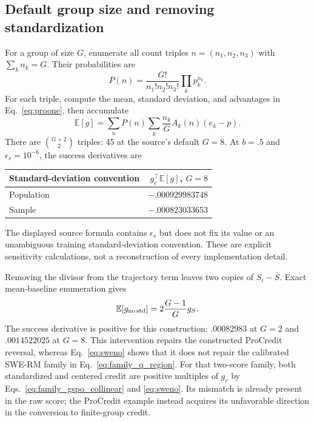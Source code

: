 \documentclass[11pt]{article}
\newcommand{\E}{\mathbb E}
\begin{document}
\subsection{Default group size and removing standardization}
For a group of size $G$, enumerate all count triples $n=(n_1,n_2,n_3)$ with $\sum_kn_k=G$. Their probabilities are
\begin{equation}
P(n)=\frac{G!}{n_1!n_2!n_3!}\prod_kp_k^{n_k}.
\end{equation}
For each triple, compute the mean, standard deviation, and advantages in Eq.~\eqref{eq:proone}, then accumulate
\begin{equation}
\E[g]=\sum_nP(n)\sum_k\frac{n_k}{G}A_k(n)(e_k-p).
\label{eq:counts}
\end{equation}
There are $\binom{G+2}{2}$ triples: 45 at the source's default $G=8$. At $b=.5$ and $\epsilon_s=10^{-6}$, the success derivatives are
\begin{center}
\begin{tabular}{lr}
\toprule
Standard-deviation convention & $g_c^\top\E[g]$, $G=8$\\
\midrule
Population & $-.000929983748$\\
Sample & $-.000823033653$\\
\bottomrule
\end{tabular}
\end{center}
The displayed source formula contains $\epsilon_s$ but does not fix its value or an unambiguous training standard-deviation convention. These are explicit sensitivity calculations, not a reconstruction of every implementation detail.

Removing the divisor from the trajectory term leaves two copies of $S_i-\bar S$. Exact mean-baseline enumeration gives
\begin{equation}
\E[g_{\rm no\,std}]=2\frac{G-1}{G}g_S.
\label{eq:pronostd}
\end{equation}
The success derivative is positive for this construction: $.00082983$ at $G=2$ and $.0014522025$ at $G=8$. This intervention repairs the constructed ProCredit reversal, whereas Eq.~\eqref{eq:sweno} shows that it does not repair the calibrated SWE-RM family in Eq.~\eqref{eq:family_q_region}. For that two-score family, both standardized and centered credit are positive multiples of $g_r$ by Eqs.~\eqref{eq:family_gspo_collinear} and \eqref{eq:sweno}. Its mismatch is already present in the raw score; the ProCredit example instead acquires its unfavorable direction in the conversion to finite-group credit.
\end{document}
